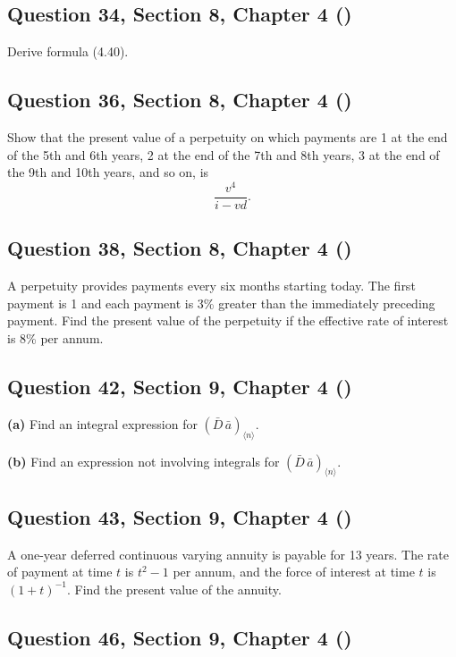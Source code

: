 \documentclass[12pt, a4paper]{article}
\newcommand{\angl}[1]{\langle #1 \rangle}
\begin{document}
\subsection*{Question 34, Section 8, Chapter 4  (\cite{toi3rd})}

\noindent Derive formula (4.40).

\subsection*{Question 36, Section 8, Chapter 4  (\cite{toi3rd})}

\noindent Show that the present value of a perpetuity on which payments are 1 at the end of the 5th and 6th years, 2 at the end of the 7th and 8th years,  
3 at the end of the 9th and 10th years, and so on, is 
\[
\frac{v^4}{i - v d}.
\]

\subsection*{Question 38, Section 8, Chapter 4  (\cite{toi3rd})}

\noindent A perpetuity provides payments every six months starting today. The first payment is 1 and each payment is 3\% greater than the immediately preceding payment. Find the present value of the perpetuity if the effective rate of interest is 8\% per annum.

\subsection*{Question 42, Section 9, Chapter 4  (\cite{toi3rd})}

\textbf{(a)} Find an integral expression for \( (\bar{D} \, \bar{a})_{\angl{n}}. \)

\textbf{(b)} Find an expression not involving integrals for \( (\bar{D} \, \bar{a})_{\angl{n}}. \)

\subsection*{Question 43, Section 9, Chapter 4  (\cite{toi3rd})}

\noindent A one-year deferred continuous varying annuity is payable for 13 years. The rate of payment at time \( t \) is \( t^2 - 1 \) per annum, and the force of interest at time \( t \) is \( (1 + t)^{-1} \). Find the present value of the annuity.

\subsection*{Question 46, Section 9, Chapter 4  (\cite{toi3rd})}
\end{document}
